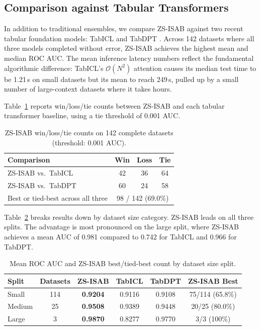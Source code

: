 \documentclass[10pt]{article}
\begin{document}
\subsection{Comparison against Tabular Transformers}

In addition to traditional ensembles, we compare ZS-ISAB against two recent tabular foundation models: TabICL \citep{huang2024tabicl} and TabDPT \citep{ma2024tabdpt}. Across 142 datasets where all three models completed without error, ZS-ISAB achieves the highest mean and median ROC AUC. The mean inference latency numbers reflect the fundamental algorithmic difference: TabICL's $\mathcal{O}(N^2)$ attention causes its median test time to be 1.21\,s on small datasets but its mean to reach 249\,s, pulled up by a small number of large-context datasets where it takes hours.

Table~\ref{tab:wins} reports win/loss/tie counts between ZS-ISAB and each tabular transformer baseline, using a tie threshold of 0.001 AUC.

\begin{table}[htbp]
\centering
\caption{ZS-ISAB win/loss/tie counts on 142 complete datasets (threshold: 0.001 AUC).}
\label{tab:wins}
\small
\begin{tabular}{@{}lccc@{}}
\toprule
\textbf{Comparison} & \textbf{Win} & \textbf{Loss} & \textbf{Tie} \\
\midrule
ZS-ISAB vs.\ TabICL & 42 & 36 & 64 \\
ZS-ISAB vs.\ TabDPT & 60 & 24 & 58 \\
\midrule
Best or tied-best across all three & \multicolumn{3}{c}{98 / 142 (69.0\%)} \\
\bottomrule
\end{tabular}
\end{table}

Table~\ref{tab:by_split} breaks results down by dataset size category. ZS-ISAB leads on all three splits. The advantage is most pronounced on the large split, where ZS-ISAB achieves a mean AUC of 0.981 compared to 0.742 for TabICL and 0.966 for TabDPT.

\begin{table}[htbp]
\centering
\caption{Mean ROC AUC and ZS-ISAB best/tied-best count by dataset size split.}
\label{tab:by_split}
\small
\begin{tabular}{@{}lccccc@{}}
\toprule
\textbf{Split} & \textbf{Datasets} & \textbf{ZS-ISAB} & \textbf{TabICL} & \textbf{TabDPT} & \textbf{ZS-ISAB Best} \\
\midrule
Small  & 114 & \textbf{0.9204} & 0.9116 & 0.9108 & 75/114 (65.8\%) \\
Medium & 25  & \textbf{0.9508} & 0.9389 & 0.9448 & 20/25 (80.0\%) \\
Large  & 3   & \textbf{0.9870} & 0.8277 & 0.9770 & 3/3 (100\%) \\
\bottomrule
\end{tabular}
\end{table}
\end{document}

